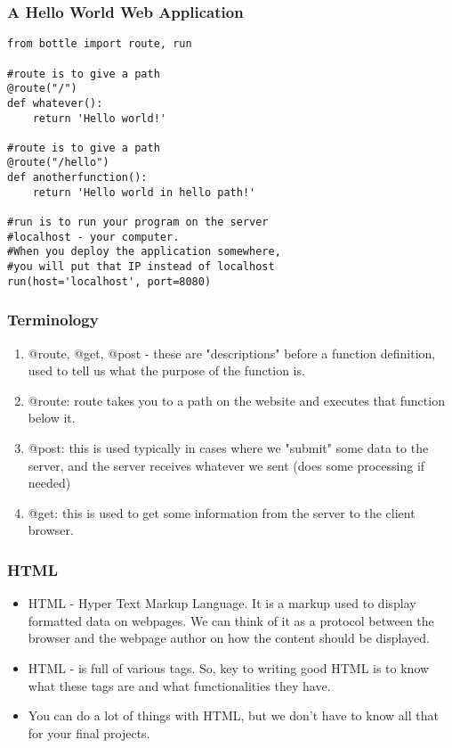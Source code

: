 \documentclass{beamer}
\begin{document}
\begin{frame}[fragile]
\frametitle{A Hello World Web Application}
\footnotesize
\begin{verbatim}
from bottle import route, run

#route is to give a path
@route("/")
def whatever():
    return 'Hello world!'

#route is to give a path
@route("/hello")
def anotherfunction():
    return 'Hello world in hello path!'

#run is to run your program on the server
#localhost - your computer.
#When you deploy the application somewhere, 
#you will put that IP instead of localhost
run(host='localhost', port=8080)
\end{verbatim}
\end{frame}

\begin{frame}
\frametitle{Terminology}
\begin{enumerate}
\item @route, @get, @post - these are "descriptions" before a function definition, used to tell us what the purpose of the function is.
\item @route: route takes you to a path on the website and executes that function below it.
\item @post: this is used typically in cases where we "submit" some data to the server, and the server receives whatever we sent (does some processing if needed)
\item @get: this is used to get some information from the server to the client browser.
\end{enumerate}
\end{frame}

\begin{frame}
\frametitle{HTML}
\begin{itemize}
\item HTML - Hyper Text Markup Language. It is a markup used to display formatted data on webpages. We can think of it as a protocol between the browser and the webpage author on how the content should be displayed.
\item HTML - is full of various tags. So, key to writing good HTML is to know what these tags are and what functionalities they have.
\item You can do a lot of things with HTML, but we don't have to know all that for your final projects.
\end{itemize}
\end{frame}
\end{document}
